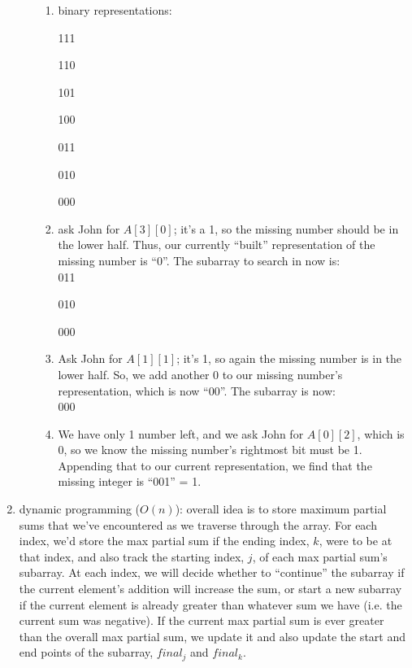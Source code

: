 \documentclass[12pt]{article}
\begin{document}
\begin{enumerate}
\begin{enumerate}
        \begin{enumerate}
            \item binary representations:
            
            111

            110

            101

            100

            011

            010

            000\\

            \item ask John for $A[3][0]$; it's a 1, so the missing number should be in the lower half. 
            Thus, our currently ``built'' representation of the missing number is ``0''. The subarray to search in now is:\\
            
            011

            010

            000\\

            \item Ask John for $A[1][1]$; it's 1, so again the missing number is in the lower half. So, we 
            add another 0 to our missing number's representation, which is now ``00''. The subarray is now:\\
            
            000\\

            \item We have only 1 number left, and we ask John for $A[0][2]$, which is 0, so we know the missing number's rightmost bit must 
            be 1. Appending that to our current representation, we find that the missing integer is ``001'' = 1.

        \end{enumerate}

    \end{enumerate}
    \item dynamic programming ($O(n)$):
    overall idea is to store maximum partial sums that we've encountered as we traverse through the array. For each index, 
    we'd store the max partial sum if the ending index, $k$, were to be at that index, and also track the starting index, 
    $j$, of each max partial sum's subarray. At each index, we will decide whether to ``continue'' the subarray if the 
    current element's addition will increase the sum, or start a new subarray if the current element is already greater 
    than whatever sum we have (i.e. the current sum was negative). If the current max partial sum is ever greater than 
    the overall max partial sum, we update it and also update the start and end points of the subarray, $final_j$ and $final_k$.


\end{enumerate}
\end{document}
